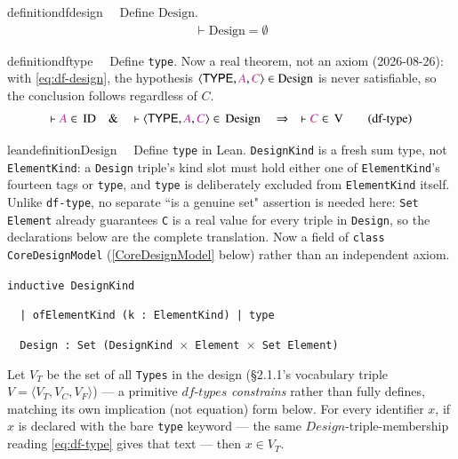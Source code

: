 \begin{restatable}{definition}{dfdesign}~~ Define $\mathrm{Design}$.
\begin{align}
\vdash \mathrm{Design} = \emptyset \label{eq:df-design}\tag{df-design}
\end{align}
\end{restatable}

\begin{restatable}{definition}{dftype}~~ Define \texttt{type}. Now a real theorem,
not an axiom (2026-08-26): with \ref{eq:df-design}, the hypothesis
$\langle \mathsf{TYPE},\mc{A},\mc{C}\rangle \in \mathrm{Design}$ is never satisfiable, so the
conclusion follows regardless of $C$.
\begin{align}
\vdash \mc{A} \in \,\mathrm{ID}\quad\&\quad \vdash \langle \mathsf{TYPE} , \mc{A} , \mc{C} \rangle
    \in \,\mathrm{Design}\quad\Rightarrow\quad \vdash \mc{C} \in
    \,\mathrm{V}\label{eq:df-type}\tag{df-type}
\end{align}
\end{restatable}

\begin{restatable}{leandefinition}{Design}~~ Define \texttt{type} in Lean.
\texttt{DesignKind} is a fresh sum type, not \texttt{ElementKind}: a \texttt{Design} triple's
kind slot must hold either one of \texttt{ElementKind}'s fourteen tags or \texttt{type}, and
\texttt{type} is deliberately excluded from \texttt{ElementKind} itself.  Unlike \texttt{df-type},
no separate ``is a genuine set" assertion is needed here: \texttt{Set Element} already
guarantees \texttt{C} is a real value for every triple in \texttt{Design}, so the declarations
below are the complete translation. Now a field of \texttt{class CoreDesignModel} (\ref{CoreDesignModel}
below) rather than an independent axiom.

\texttt{\textcolor{leancolor}{inductive} \textcolor{leanyellow}{DesignKind}}

\texttt{~~| ofElementKind (k : ElementKind) | type}

\texttt{~~Design : Set (DesignKind $\times$ Element $\times$ Set Element)}
\label{Design}
\end{restatable}

\pn Let $V_T$ be the set of all \texttt{Types} in the design (\S2.1.1's vocabulary triple $V =
\langle V_T, V_C, V_F \rangle$) --- a primitive $df\text{-}types$ \emph{constrains} rather than
fully defines, matching its own implication (not equation) form below. For every identifier $x$,
if $x$ is declared with the bare \texttt{type} keyword --- the same $Design$-triple-membership
reading \ref{eq:df-type} gives that text --- then $x \in V_T$.

